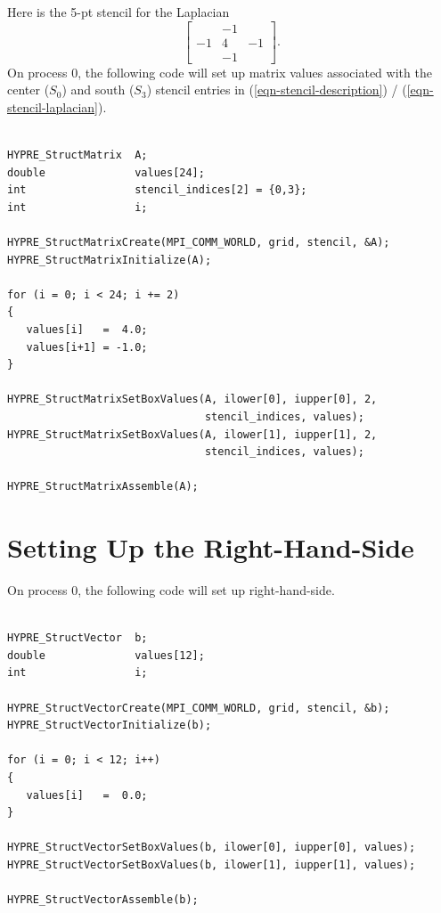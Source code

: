 Here is the 5-pt stencil for the Laplacian
\begin{equation}\label{eqn-stencil-laplacian}
\left [
\begin{array}{ccc}
   & -1 &    \\
-1 &  4 & -1 \\
   & -1 &   
\end{array}
\right ] .
\end{equation}
On process 0, the following code will set up matrix values associated
with the center ($S_0$) and south ($S_3$) stencil entries in
(\ref{eqn-stencil-description}) / (\ref{eqn-stencil-laplacian}).
\begin{display}
\begin{verbatim}

HYPRE_StructMatrix  A;
double              values[24];
int                 stencil_indices[2] = {0,3};
int                 i;

HYPRE_StructMatrixCreate(MPI_COMM_WORLD, grid, stencil, &A);
HYPRE_StructMatrixInitialize(A);

for (i = 0; i < 24; i += 2)
{
   values[i]   =  4.0;
   values[i+1] = -1.0;
}

HYPRE_StructMatrixSetBoxValues(A, ilower[0], iupper[0], 2,
                               stencil_indices, values);
HYPRE_StructMatrixSetBoxValues(A, ilower[1], iupper[1], 2,
                               stencil_indices, values);

HYPRE_StructMatrixAssemble(A);

\end{verbatim}
\end{display}


\section{Setting Up the Right-Hand-Side}
\label{Setting Up the Right-Hand-Side}

On process 0, the following code will set up right-hand-side.
\begin{display}
\begin{verbatim}

HYPRE_StructVector  b;
double              values[12];
int                 i;

HYPRE_StructVectorCreate(MPI_COMM_WORLD, grid, stencil, &b);
HYPRE_StructVectorInitialize(b);

for (i = 0; i < 12; i++)
{
   values[i]   =  0.0;
}

HYPRE_StructVectorSetBoxValues(b, ilower[0], iupper[0], values);
HYPRE_StructVectorSetBoxValues(b, ilower[1], iupper[1], values);

HYPRE_StructVectorAssemble(b);

\end{verbatim}
\end{display}


